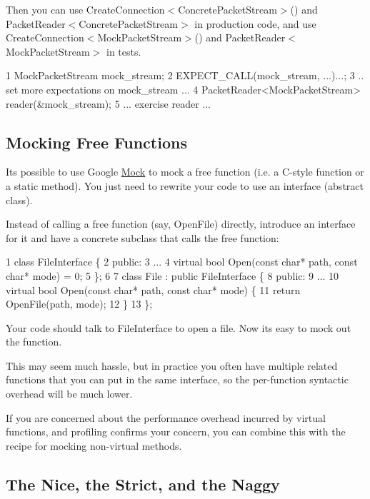 Then you can use {\ttfamily Create\+Connection$<$Concrete\+Packet\+Stream$>$()} and {\ttfamily Packet\+Reader$<$Concrete\+Packet\+Stream$>$} in production code, and use {\ttfamily Create\+Connection$<$Mock\+Packet\+Stream$>$()} and {\ttfamily Packet\+Reader$<$Mock\+Packet\+Stream$>$} in tests.


\begin{DoxyCode}
1 MockPacketStream mock\_stream;
2 EXPECT\_CALL(mock\_stream, ...)...;
3 .. set more expectations on mock\_stream ...
4 PacketReader<MockPacketStream> reader(&mock\_stream);
5 ... exercise reader ...
\end{DoxyCode}


\subsection*{Mocking Free Functions}

It\textquotesingle{}s possible to use Google \hyperlink{class_mock}{Mock} to mock a free function (i.\+e. a C-\/style function or a static method). You just need to rewrite your code to use an interface (abstract class).

Instead of calling a free function (say, {\ttfamily Open\+File}) directly, introduce an interface for it and have a concrete subclass that calls the free function\+:


\begin{DoxyCode}
1 class FileInterface \{
2  public:
3   ...
4   virtual bool Open(const char* path, const char* mode) = 0;
5 \};
6 
7 class File : public FileInterface \{
8  public:
9   ...
10   virtual bool Open(const char* path, const char* mode) \{
11     return OpenFile(path, mode);
12   \}
13 \};
\end{DoxyCode}


Your code should talk to {\ttfamily File\+Interface} to open a file. Now it\textquotesingle{}s easy to mock out the function.

This may seem much hassle, but in practice you often have multiple related functions that you can put in the same interface, so the per-\/function syntactic overhead will be much lower.

If you are concerned about the performance overhead incurred by virtual functions, and profiling confirms your concern, you can combine this with the recipe for mocking non-\/virtual methods.

\subsection*{The Nice, the Strict, and the Naggy}

